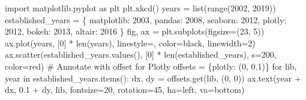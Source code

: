 \documentclass[
  letterpaper,
  DIV=11,
  numbers=noendperiod]{scrartcl}
\newenvironment{Shaded}{\begin{snugshade}}{\end{snugshade}}
\newcommand{\BuiltInTok}[1]{\textcolor[rgb]{0.00,0.23,0.31}{#1}}
\newcommand{\CommentTok}[1]{\textcolor[rgb]{0.37,0.37,0.37}{#1}}
\newcommand{\ControlFlowTok}[1]{\textcolor[rgb]{0.00,0.23,0.31}{#1}}
\newcommand{\DecValTok}[1]{\textcolor[rgb]{0.68,0.00,0.00}{#1}}
\newcommand{\FloatTok}[1]{\textcolor[rgb]{0.68,0.00,0.00}{#1}}
\newcommand{\ImportTok}[1]{\textcolor[rgb]{0.00,0.46,0.62}{#1}}
\newcommand{\KeywordTok}[1]{\textcolor[rgb]{0.00,0.23,0.31}{#1}}
\newcommand{\NormalTok}[1]{\textcolor[rgb]{0.00,0.23,0.31}{#1}}
\newcommand{\OperatorTok}[1]{\textcolor[rgb]{0.37,0.37,0.37}{#1}}
\newcommand{\StringTok}[1]{\textcolor[rgb]{0.13,0.47,0.30}{#1}}
\begin{document}
\begin{Shaded}
\begin{Highlighting}[]
\ImportTok{import}\NormalTok{ matplotlib.pyplot }\ImportTok{as}\NormalTok{ plt}
\NormalTok{plt.xkcd()}
\NormalTok{years }\OperatorTok{=} \BuiltInTok{list}\NormalTok{(}\BuiltInTok{range}\NormalTok{(}\DecValTok{2002}\NormalTok{, }\DecValTok{2019}\NormalTok{))}
\NormalTok{established\_years }\OperatorTok{=}\NormalTok{ \{}
    \StringTok{\textquotesingle{}matplotlib\textquotesingle{}}\NormalTok{: }\DecValTok{2003}\NormalTok{,}
    \StringTok{\textquotesingle{}pandas\textquotesingle{}}\NormalTok{: }\DecValTok{2008}\NormalTok{,}
    \StringTok{\textquotesingle{}seaborn\textquotesingle{}}\NormalTok{: }\DecValTok{2012}\NormalTok{,}
    \StringTok{\textquotesingle{}plotly\textquotesingle{}}\NormalTok{: }\DecValTok{2012}\NormalTok{,}
    \StringTok{\textquotesingle{}bokeh\textquotesingle{}}\NormalTok{: }\DecValTok{2013}\NormalTok{,}
    \StringTok{\textquotesingle{}altair\textquotesingle{}}\NormalTok{: }\DecValTok{2016}
\NormalTok{\}}
\NormalTok{fig, ax }\OperatorTok{=}\NormalTok{ plt.subplots(figsize}\OperatorTok{=}\NormalTok{(}\DecValTok{23}\NormalTok{, }\DecValTok{5}\NormalTok{))}
\NormalTok{ax.plot(years, [}\DecValTok{0}\NormalTok{] }\OperatorTok{*} \BuiltInTok{len}\NormalTok{(years), linestyle}\OperatorTok{=}\StringTok{\textquotesingle{}{-}\textquotesingle{}}\NormalTok{, color}\OperatorTok{=}\StringTok{\textquotesingle{}black\textquotesingle{}}\NormalTok{, linewidth}\OperatorTok{=}\DecValTok{2}\NormalTok{)}
\NormalTok{ax.scatter(established\_years.values(), [}\DecValTok{0}\NormalTok{] }\OperatorTok{*} \BuiltInTok{len}\NormalTok{(established\_years), s}\OperatorTok{=}\DecValTok{200}\NormalTok{, color}\OperatorTok{=}\StringTok{\textquotesingle{}red\textquotesingle{}}\NormalTok{)}
\CommentTok{\# Annotate with offset for Plotly}
\NormalTok{offsets }\OperatorTok{=}\NormalTok{ \{}\StringTok{\textquotesingle{}plotly\textquotesingle{}}\NormalTok{: (}\DecValTok{0}\NormalTok{, }\FloatTok{0.1}\NormalTok{)\}}
\ControlFlowTok{for}\NormalTok{ lib, year }\KeywordTok{in}\NormalTok{ established\_years.items():}
\NormalTok{    dx, dy }\OperatorTok{=}\NormalTok{ offsets.get(lib, (}\DecValTok{0}\NormalTok{, }\DecValTok{0}\NormalTok{))}
\NormalTok{    ax.text(year }\OperatorTok{+}\NormalTok{ dx, }\FloatTok{0.1} \OperatorTok{+}\NormalTok{ dy, lib, fontsize}\OperatorTok{=}\DecValTok{20}\NormalTok{, rotation}\OperatorTok{=}\DecValTok{45}\NormalTok{, ha}\OperatorTok{=}\StringTok{\textquotesingle{}left\textquotesingle{}}\NormalTok{, va}\OperatorTok{=}\StringTok{\textquotesingle{}bottom\textquotesingle{}}\NormalTok{)}

\end{Highlighting}
\end{Shaded}
\end{document}
